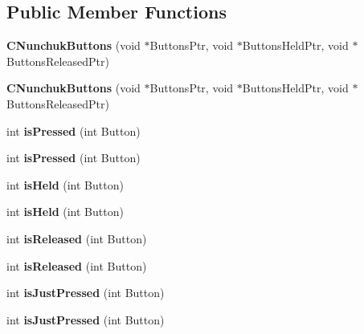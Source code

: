\subsection*{Public Member Functions}
\begin{DoxyCompactItemize}
\item 
\hypertarget{class_c_nunchuk_buttons_a9ba6eadd235b5078f8d1b751488b7002}{{\bfseries C\-Nunchuk\-Buttons} (void $\ast$Buttons\-Ptr, void $\ast$Buttons\-Held\-Ptr, void $\ast$Buttons\-Released\-Ptr)}\label{class_c_nunchuk_buttons_a9ba6eadd235b5078f8d1b751488b7002}

\item 
\hypertarget{class_c_nunchuk_buttons_a9ba6eadd235b5078f8d1b751488b7002}{{\bfseries C\-Nunchuk\-Buttons} (void $\ast$Buttons\-Ptr, void $\ast$Buttons\-Held\-Ptr, void $\ast$Buttons\-Released\-Ptr)}\label{class_c_nunchuk_buttons_a9ba6eadd235b5078f8d1b751488b7002}

\item 
\hypertarget{class_c_button_base_a0d4758b9e756a8c3c2bb39b907ea9170}{int {\bfseries is\-Pressed} (int Button)}\label{class_c_button_base_a0d4758b9e756a8c3c2bb39b907ea9170}

\item 
\hypertarget{class_c_button_base_a0d4758b9e756a8c3c2bb39b907ea9170}{int {\bfseries is\-Pressed} (int Button)}\label{class_c_button_base_a0d4758b9e756a8c3c2bb39b907ea9170}

\item 
\hypertarget{class_c_button_base_a67e38daead9d22e33f6a3d85902d1f98}{int {\bfseries is\-Held} (int Button)}\label{class_c_button_base_a67e38daead9d22e33f6a3d85902d1f98}

\item 
\hypertarget{class_c_button_base_a67e38daead9d22e33f6a3d85902d1f98}{int {\bfseries is\-Held} (int Button)}\label{class_c_button_base_a67e38daead9d22e33f6a3d85902d1f98}

\item 
\hypertarget{class_c_button_base_a575dee487bcca1abf29c1084dfdd5bb8}{int {\bfseries is\-Released} (int Button)}\label{class_c_button_base_a575dee487bcca1abf29c1084dfdd5bb8}

\item 
\hypertarget{class_c_button_base_a575dee487bcca1abf29c1084dfdd5bb8}{int {\bfseries is\-Released} (int Button)}\label{class_c_button_base_a575dee487bcca1abf29c1084dfdd5bb8}

\item 
\hypertarget{class_c_button_base_ab74fd21217c5e379a613b7474af4f9b8}{int {\bfseries is\-Just\-Pressed} (int Button)}\label{class_c_button_base_ab74fd21217c5e379a613b7474af4f9b8}

\item 
\hypertarget{class_c_button_base_ab74fd21217c5e379a613b7474af4f9b8}{int {\bfseries is\-Just\-Pressed} (int Button)}\label{class_c_button_base_ab74fd21217c5e379a613b7474af4f9b8}

\end{DoxyCompactItemize}
